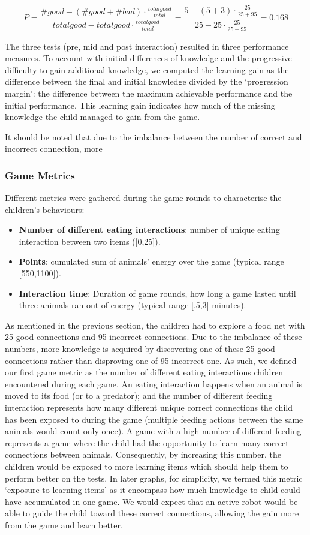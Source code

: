 \begin{equation}
P=\frac{\#good-(\#good+\#bad) \cdot \frac{total good}{total}}{total good - total good \cdot \frac{total good}{total}} = \frac{5-(5+3) \cdot \frac{25}{25+95}}{25 - 25 \cdot \frac{25}{25+95}}=0.168
\end{equation}
			
The three tests (pre, mid and post interaction) resulted in three performance measures. To account with initial differences of knowledge and the progressive difficulty to gain additional knowledge, we computed the learning gain as the difference between the final and initial knowledge divided by the `progression margin': the difference between the maximum achievable performance and the initial performance. This learning gain indicates how much of the missing knowledge the child managed to gain from the game.

It should be noted that due to the imbalance between the number of correct and incorrect connection, more 
			
\subsubsection{Game Metrics}
Different metrics were gathered during the game rounds to characterise the children's behaviours:
\begin{itemize}
	\item \textbf{Number of different eating interactions}: number of unique eating interaction between two items ([0,25]).
	\item \textbf{Points}: cumulated sum of animals' energy over the game (typical range [550,1100]).
	\item \textbf{Interaction time}: Duration of game rounds, how long a game lasted until three animals ran out of energy (typical range [.5,3] minutes).
\end{itemize}


As mentioned in the previous section, the children had to explore a food net with 25 good connections and 95 incorrect connections. Due to the imbalance of these numbers, more knowledge is acquired by discovering one of these 25 good connections rather than disproving one of 95 incorrect one. As such, we defined our first game metric as the number of different eating interactions children encountered during each game. An eating interaction happens when an animal is moved to its food (or to a predator); and the number of different feeding interaction represents how many different unique correct connections the child has been exposed to during the game (multiple feeding actions between the same animals would count only once). A game with a high number of different feeding represents a game where the child had the opportunity to learn many correct connections between animals. Consequently, by increasing this number, the children would be exposed to more learning items which should help them to perform better on the tests. In later graphs, for simplicity, we termed this metric `exposure to learning items' as it encompass how much knowledge to child could have accumulated in one game. We would expect that an active robot would be able to guide the child toward these correct connections, allowing the gain more from the game and learn better.


